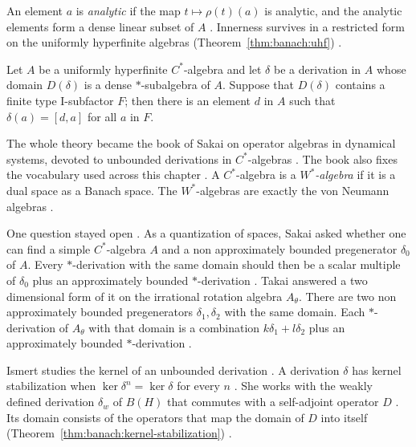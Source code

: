 An element $a$ is \emph{analytic} if the map $t\mapsto\rho(t)(a)$ is
analytic, and the analytic elements form a dense linear subset of $A$
\cite[p.~428]{Sakai1976OneParameter}. Innerness survives in a restricted
form on the uniformly hyperfinite algebras (Theorem~\ref{thm:banach:uhf})
\cite[Theorem~2, p.~435]{Sakai1976OneParameter}.\begin{theorem}\label{thm:banach:uhf}
Let $A$ be a uniformly hyperfinite $C^*$-algebra and let $\delta$ be a
derivation in $A$ whose domain $D(\delta)$ is a dense $*$-subalgebra of
$A$. Suppose that $D(\delta)$ contains a finite type I-subfactor $F$;
then there is an element $d$ in $A$ such that $\delta(a)=[d,a]$ for all
$a$ in $F$.
\end{theorem}

The whole theory became the book of Sakai on operator algebras in dynamical
systems, devoted to unbounded derivations in $C^*$-algebras
\cite{Sakai1991Dynamical}. The book also fixes the vocabulary used across
this chapter \cite[p.~2]{Sakai1991Dynamical}. A $C^*$-algebra is a \emph{$W^*$-algebra} if it is a dual
space as a Banach space. The $W^*$-algebras are exactly the von
Neumann algebras \cite[p.~2]{Sakai1991Dynamical}.

One question stayed open \cite[p.~202]{Takai1981SakaiProblem}. As a
quantization of spaces, Sakai asked
whether one can find a simple $C^*$-algebra $A$ and a non approximately
bounded pregenerator $\delta_0$ of $A$. Every $*$-derivation
with the same domain should then be a scalar multiple of $\delta_0$ plus an
approximately bounded $*$-derivation \cite[p.~202]{Takai1981SakaiProblem}.
Takai answered a two dimensional form of it on the irrational rotation
algebra $A_\theta$. There are two non approximately bounded
pregenerators $\delta_1,\delta_2$ with the same domain. Each
$*$-derivation of $A_\theta$ with that domain is a combination
$k\delta_1+l\delta_2$ plus an approximately bounded $*$-derivation
\cite[p.~202]{Takai1981SakaiProblem}.

Ismert studies the kernel of an unbounded derivation
\cite[p.~1]{Ismert2018Kernel}. A derivation $\delta$ has kernel
stabilization when $\ker\delta^{n}=\ker\delta$ for every $n$
\cite[p.~1]{Ismert2018Kernel}. She works with the weakly defined derivation
$\delta_{w}$ of $B(H)$ that commutes with a self-adjoint operator $D$
\cite[p.~1]{Ismert2018Kernel}. Its domain consists of the operators that
map the domain of $D$ into itself (Theorem~\ref{thm:banach:kernel-stabilization}) \cite[p.~3]{Ismert2018Kernel}.

